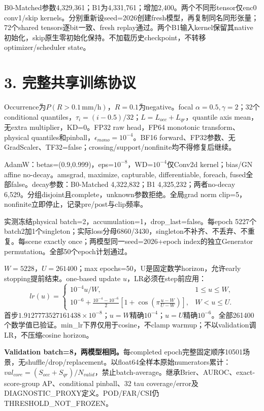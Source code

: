 \documentclass[10pt,a4paper,fontset=windows]{ctexart}
\begin{document}
B0-Matched参数4,329,361；B1为4,331,761；增加2,400。两个不同形tensor仅enc0 conv1/skip kernels。分别重新设seed=2026创建fresh模型，再复制同名同形张量；72个shared tensors逐bit一致、fresh replay通过。两个B1输入kernel保留其native初始化，skip原生零初始化保持。不加载历史checkpoint，不转移optimizer/scheduler state。
\newpage
\section*{3. 完整共享训练协议}
Occurrence为$P(R>0.1\,\mathrm{mm/h})$，$R=0.1$为negative。focal $\alpha=0.5,\gamma=2$；32个conditional quantiles，$\tau_i=(i-0.5)/32$；$L=L_{occ}+L_{qr}$，quantile axis mean，无extra multiplier，KD=0。FP32 raw head，FP64 monotonic transform、physical quantiles和pinball，$\epsilon_{mono}=10^{-4}$。BF16 forward、FP32参数、无GradScaler、TF32=false；crossing/support/nonfinite均不得修复后继续。

AdamW：betas=(0.9,0.999)，eps=$10^{-8}$，WD=$10^{-4}$仅Conv2d kernel；bias/GN affine no-decay。amsgrad, maximize, capturable, differentiable, foreach, fused全部false。decay参数：B0-Matched 4,322,832；B1 4,325,232；两者no-decay 6,529。分组disjoint且complete，unknown参数拒绝。全局grad norm clip=5，nonfinite立即停止，记录pre/post与clip频率。

实测冻结physical batch=2，accumulation=1，drop\_last=false。每epoch 5227个batch2加1个singleton；实际loss分母6860/3430，singleton不补齐、不丢弃、不重复。每scene exactly once；两模型同一seed=2026+epoch index的独立Generator permutation。全部50个epoch计划通过。

$W=5228$，$U=261400$；max epochs=50，U是固定数学horizon，允许early stopping提前结束。one-based update $u$，LR必须在step前应用：
\[
lr(u)=\begin{cases}
10^{-4}u/W,&1\le u\le W,\\
10^{-6}+\frac{10^{-4}-10^{-6}}2\left[1+\cos\!\left(\pi\frac{u-W}{U-W}\right)\right],&W<u\le U.
\end{cases}
\]
首步$1.9127773527161438\times10^{-8}$；$u=W$精确$10^{-4}$；$u=U$精确$10^{-6}$。全部261400个数学值已验证。min\_lr下界仅用于cosine，不clamp warmup；不以validation调LR，不压缩cosine horizon。

\textbf{Validation batch=8，两模型相同。}每completed epoch完整固定顺序10501场景，无shuffle/drop/replacement。以float64全样本原始numerators累计：$val_{core}=(S_{occ}+S_{qr})/N_{valid}$，禁止batch-average。继承Brier、AUROC、exact-score-group AP、conditional pinball、32 tau coverage/error及DIAGNOSTIC\_PROXY定义。POD/FAR/CSI仍THRESHOLD\_NOT\_FROZEN。
\end{document}
